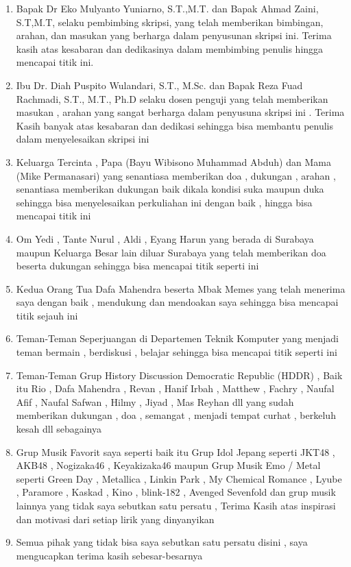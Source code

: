   \begin{enumerate}[nolistsep]
    \item Bapak Dr Eko Mulyanto Yuniarno, S.T.,M.T. dan Bapak Ahmad Zaini, S.T,M.T, selaku pembimbing skripsi, yang telah memberikan bimbingan, arahan, dan masukan yang berharga dalam penyusunan skripsi ini. Terima kasih atas kesabaran dan dedikasinya dalam membimbing penulis hingga mencapai titik ini.
    \item Ibu Dr. Diah Puspito Wulandari, S.T., M.Sc. dan Bapak Reza Fuad Rachmadi, S.T., M.T., Ph.D selaku dosen penguji yang telah memberikan masukan , arahan yang sangat berharga dalam penyusuna skripsi ini . Terima Kasih banyak atas kesabaran dan dedikasi sehingga bisa membantu penulis dalam menyelesaikan skripsi ini
    \item Keluarga Tercinta , Papa (Bayu Wibisono Muhammad Abduh) dan Mama (Mike Permanasari) yang senantiasa memberikan doa , dukungan , arahan , senantiasa memberikan dukungan baik dikala kondisi suka maupun duka sehingga bisa menyelesaikan perkuliahan ini dengan baik , hingga bisa mencapai titik ini 
    \item Om Yedi , Tante Nurul , Aldi , Eyang Harun yang berada di Surabaya maupun Keluarga Besar lain diluar Surabaya yang telah memberikan doa beserta dukungan sehingga bisa mencapai titik seperti ini
    \item Kedua Orang Tua Dafa Mahendra beserta Mbak Memes yang telah menerima saya dengan baik , mendukung dan mendoakan saya sehingga bisa mencapai titik sejauh ini
    \item Teman-Teman Seperjuangan di Departemen Teknik Komputer yang menjadi teman bermain , berdiskusi , belajar sehingga bisa mencapai titik seperti ini 
    \item Teman-Teman Grup History Discussion Democratic Republic (HDDR) , Baik itu Rio , Dafa Mahendra , Revan , Hanif Irbah , Matthew , Fachry , Naufal Afif , Naufal Safwan , Hilmy , Jiyad , Mas Reyhan dll yang sudah memberikan dukungan , doa , semangat , menjadi tempat curhat , berkeluh kesah dll sebagainya
    \item Grup Musik Favorit saya seperti baik itu Grup Idol Jepang seperti JKT48 , AKB48 , Nogizaka46 , Keyakizaka46 maupun Grup Musik Emo / Metal seperti Green Day , Metallica , Linkin Park , My Chemical Romance , Lyube , Paramore , Kaskad , Kino , blink-182 , Avenged Sevenfold dan grup musik lainnya yang tidak saya sebutkan satu persatu , Terima Kasih atas inspirasi dan motivasi dari setiap lirik yang dinyanyikan
    \item Semua pihak yang tidak bisa saya sebutkan satu persatu disini , saya mengucapkan terima kasih sebesar-besarnya
  
  \end{enumerate}
  
